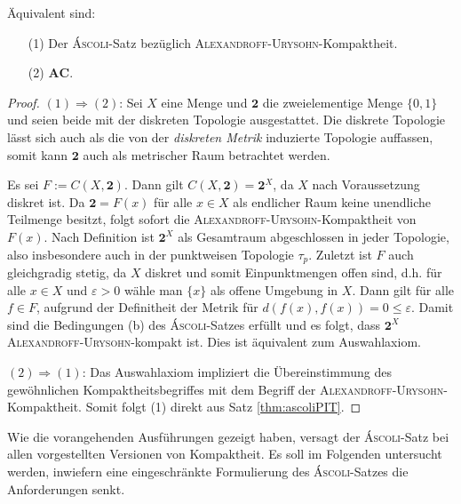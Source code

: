 \begin{thm}
  Äquivalent sind:
  \begin{enumerate}
    \item[(1)] Der \textsc{Áscoli}-Satz bezüglich \textsc{Alexandroff}-\textsc{Urysohn}-Kompaktheit.
    \item[(2)] $\mathbf{AC}$.
  \end{enumerate}
\end{thm}

\begin{proof}
  $(1) \Rightarrow (2)$: Sei $X$ eine Menge und $\mathbf{2}$ die zweielementige Menge $\{0,1\}$ und seien beide mit der diskreten Topologie ausgestattet. 
  Die diskrete Topologie lässt sich auch als die von der \textit{diskreten Metrik} induzierte Topologie auffassen, somit kann $\mathbf{2}$ auch als metrischer Raum betrachtet werden. 

  Es sei $F := C(X, \mathbf{2})$.
  Dann gilt $C(X, \mathbf{2}) = \mathbf{2}^X$, da $X$ nach Voraussetzung diskret ist.
  Da $\mathbf{2} = F(x)$ für alle $x \in X$ als endlicher Raum keine unendliche Teilmenge besitzt, folgt sofort die \textsc{Alexandroff}-\textsc{Urysohn}-Kompaktheit von $F(x)$.
  Nach Definition ist $\mathbf{2}^X$ als Gesamtraum abgeschlossen in jeder Topologie, also insbesondere auch in der punktweisen Topologie $\tau_p$.
  Zuletzt ist $F$ auch gleichgradig stetig, da $X$ diskret und somit Einpunktmengen offen sind, d.h. für alle $x \in X$ und $\varepsilon > 0$ wähle man $\{x\}$ als offene Umgebung in $X$. Dann gilt für alle $f \in F$, aufgrund der Definitheit der Metrik für  $d(f(x),f(x)) = 0 \leq \varepsilon$.
  Damit sind die Bedingungen (b) des \textsc{Áscoli}-Satzes erfüllt und es folgt, dass $\mathbf{2}^X$ \textsc{Alexandroff}-\textsc{Urysohn}-kompakt ist. Dies ist äquivalent zum Auswahlaxiom.

  $(2)\Rightarrow(1)$: Das Auswahlaxiom impliziert die Übereinstimmung des gewöhnlichen Kompaktheitsbegriffes mit dem Begriff der \textsc{Alexandroff}-\textsc{Urysohn}-Kompaktheit. Somit folgt (1) direkt aus Satz \ref{thm:ascoliPIT}.
\end{proof}

Wie die vorangehenden Ausführungen gezeigt haben, versagt der \textsc{Áscoli}-Satz bei allen vorgestellten Versionen von Kompaktheit. Es soll im Folgenden untersucht werden, inwiefern eine eingeschränkte Formulierung des \textsc{Áscoli}-Satzes die Anforderungen senkt.

